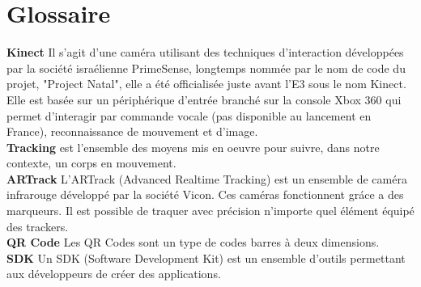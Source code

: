 \chapter{Glossaire}

\textbf{Kinect} Il s'agit d'une caméra utilisant des techniques d'interaction développées par la société israélienne PrimeSense, longtemps nommée par le nom de code du projet, "Project Natal", elle a été officialisée juste avant l'E3 sous le nom Kinect. Elle est basée sur un périphérique d'entrée branché sur la console Xbox 360 qui permet d'interagir par commande vocale (pas disponible au lancement en France), reconnaissance de mouvement et d'image.\\

\textbf{Tracking} est l'ensemble des moyens mis en oeuvre pour suivre, dans
notre contexte, un corps en mouvement.\\

\textbf{ARTrack} L’ARTrack (Advanced Realtime Tracking) est un ensemble de caméra infrarouge développé par la société Vicon. Ces caméras fonctionnent gráce a des marqueurs. Il est possible de traquer avec précision n’importe quel élément équipé des trackers.\\

\textbf{QR Code} Les QR Codes sont un type de codes barres à deux dimensions.\\

\textbf{SDK} Un SDK (Software Development Kit) est un ensemble d'outils permettant aux développeurs de créer des applications.